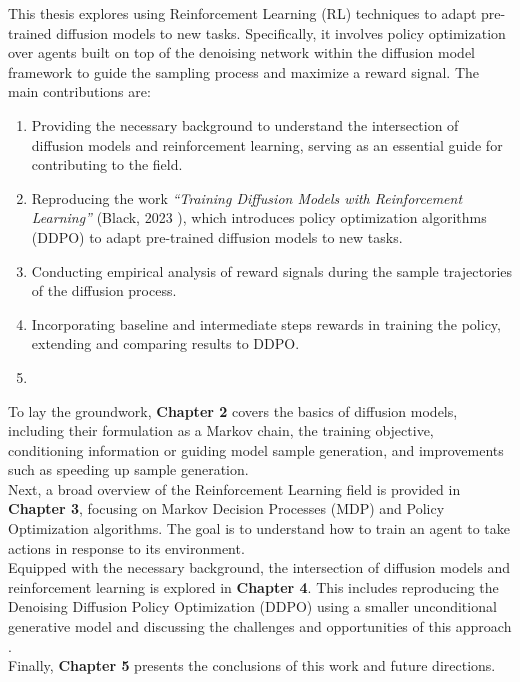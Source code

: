 This thesis explores using Reinforcement Learning (RL) techniques to adapt pre-trained diffusion models to new tasks. Specifically, it involves policy optimization over agents built on top of the denoising network within the diffusion model framework to guide the sampling process and maximize a reward signal. The main contributions are: \\

\begin{enumerate}
    \item Providing the necessary background to understand the intersection of diffusion models and reinforcement learning, serving as an essential guide for contributing to the field.
    \item Reproducing the work \textit{``Training Diffusion Models with Reinforcement Learning''} (Black, 2023 \cite{black2023training}), which introduces policy optimization algorithms (DDPO) to adapt pre-trained diffusion models to new tasks.
    \item Conducting empirical analysis of reward signals during the sample trajectories of the diffusion process.
    \item Incorporating baseline and intermediate steps rewards in training the policy, extending and comparing results to DDPO.
    \item {}
\end{enumerate}

\noindent To lay the groundwork, \textbf{Chapter 2} covers the basics of diffusion models, including their formulation as a Markov chain, the training objective, conditioning information or guiding model sample generation, and improvements such as speeding up sample generation. \\

\noindent Next, a broad overview of the Reinforcement Learning field is provided in \textbf{Chapter 3}, focusing on Markov Decision Processes (MDP) and Policy Optimization algorithms. The goal is to understand how to train an agent to take actions in response to its environment. \\

\noindent Equipped with the necessary background, the intersection of diffusion models and reinforcement learning is explored in \textbf{Chapter 4}. This includes reproducing the Denoising Diffusion Policy Optimization (DDPO) \cite{black2023training} using a smaller unconditional generative model and discussing the challenges and opportunities of this approach . \\

\noindent Finally, \textbf{Chapter 5} presents the conclusions of this work and future directions. \\
